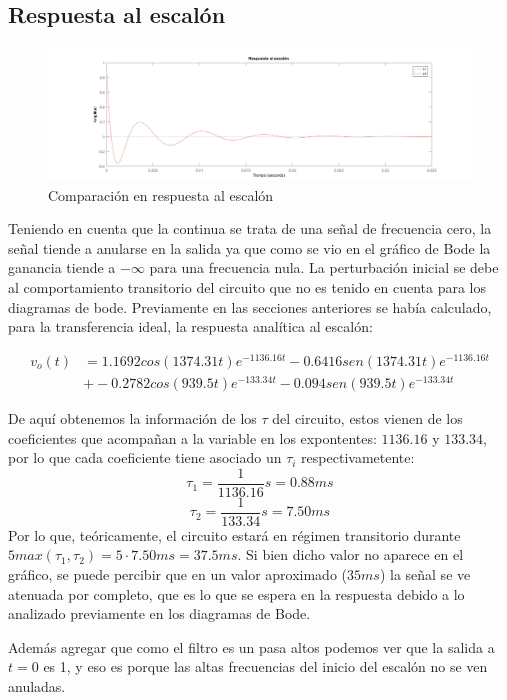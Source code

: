 \subsection{Respuesta al escalón}
\begin{figure}[!h]
    \centering
    \includegraphics[width=1\textwidth]{resources/Comparacion_escalon.png}
    \caption{Comparación en respuesta al escalón}
\end{figure}

Teniendo en cuenta que la continua se trata de una señal de frecuencia cero, la señal tiende a anularse en la salida ya que como se vio en el gráfico de Bode la ganancia tiende a $-\infty$ para una frecuencia nula. La perturbación inicial se debe al comportamiento transitorio del circuito que no es tenido en cuenta para los diagramas de bode. Previamente en las secciones anteriores se había calculado, para la transferencia ideal, la respuesta analítica al escalón:

\begin{align*}
    v_o(t) & = 1.1692cos(1374.31t)e^{-1136.16t} - 0.6416sen(1374.31t)e^{-1136.16t}\\
           & + -0.2782cos(939.5t)e^{-133.34t} -0.094sen(939.5t)e^{-133.34t}
\end{align*}

De aquí obtenemos la información de los $\tau$ del circuito, estos vienen de los coeficientes que acompañan a la variable en los expontentes: $1136.16$ y $133.34$, por lo que cada coeficiente tiene asociado un $\tau_i$ respectivametente:
$$
    \tau_1 = \frac{1}{1136.16} s = 0.88ms
$$
$$
    \tau_2 = \frac{1}{133.34} s = 7.50ms
$$
Por lo que, teóricamente, el circuito estará en régimen transitorio durante $5 max(\tau_1, \tau_2) = 5 \cdot 7.50ms = 37.5ms$. Si bien dicho valor no aparece en el gráfico, se puede percibir que en un valor aproximado ($35ms$) la señal se ve atenuada por completo, que es lo que se espera en la respuesta debido a lo analizado previamente en los diagramas de Bode. 

Además agregar que como el filtro es un pasa altos podemos ver que la salida a $t=0$ es 1, y eso es porque las altas frecuencias del inicio del escalón no se ven anuladas.


